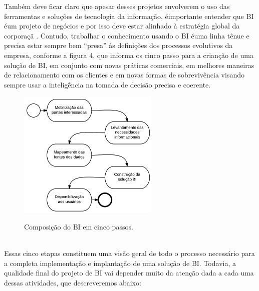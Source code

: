 Tamb\'{e}m deve ficar claro que apesar desses projetos envolverem o uso das ferramentas e solu\c{c}\~{o}es de tecnologia da informa\c{c}\~{a}o, \'{e}importante entender que BI \'{e}um projeto de neg\'{o}cios e por isso deve estar alinhado \`{a} estrat\'{e}gia global da corpora\c{c}\~{a}
.
Contudo, trabalhar o conhecimento usando o BI \'{e}uma linha tênue e precisa estar sempre bem “presa” \`{a}s defini\c{c}\~{o}es dos processos evolutivos da empresa, conforme a figura 4, que informa os cinco passo para a crian\c{c}\~{a}o de uma solu\c{c}\~{a}o de BI, em conjunto com novas pr\'{a}ticas comerciais, em melhores maneiras de relacionamento com os clientes e em novas formas de sobrevivência visando sempre usar a intelig\^{e}̂ncia na tomada de decis\~{a}o precisa e coerente.

\begin{figure}[H]
	\vspace*{0,2cm}
    \centering
    \caption{Composi\c{c}\~{a}o do BI em cinco passos.}
    \includegraphics[width=0.6\textwidth]{./04-figuras/figura-04}
    \label{fig:ilustfig04}
\end{figure}
\vspace*{-0,9cm}
{\raggedright {}}\\

Essas cinco etapas constituem uma vis\~{a}o geral de todo o processo necess\'{a}rio para a completa implementa\c{c}\~{a}o e implanta\c{c}\~{a}o de uma solu\c{c}\~{a}o de BI. Todavia, a qualidade final do projeto de BI vai depender muito da aten\c{c}\~{a}o dada a cada uma dessas atividades, que descreveremos abaixo:

